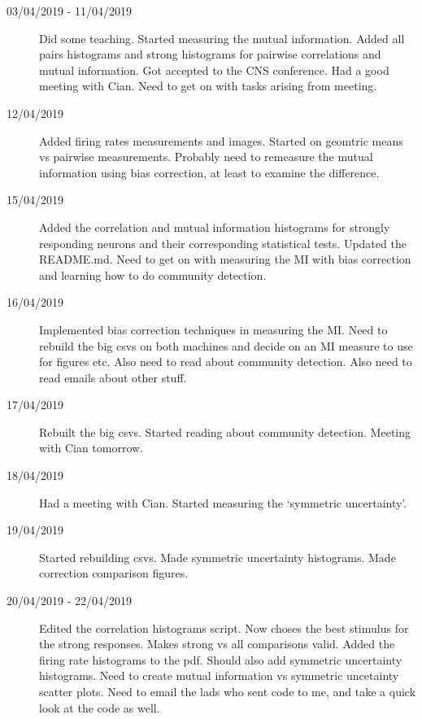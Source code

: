 \documentclass[a4paper,12pt]{article}
\theoremstyle{definition}
\begin{document}
\begin{description}
				\item[03/04/2019 - 11/04/2019] Did some teaching. Started measuring the mutual information. Added all pairs histograms and strong histograms for pairwise correlations and mutual information. Got accepted to the CNS conference. Had a good meeting with Cian. Need to get on with tasks arising from meeting.

				\item[12/04/2019] Added firing rates measurements and images. Started on geomtric means vs pairwise measurements. Probably need to remeasure the mutual information using bias correction, at least to examine the difference.

                                \item[15/04/2019] Added the correlation and mutual information histograms for strongly responding neurons and their corresponding statistical tests. Updated the README.md. Need to get on with measuring the MI with bias correction and learning how to do community detection.

                                \item[16/04/2019] Implemented bias correction techniques in measuring the MI. Need to rebuild the big csvs on both machines and decide on an MI measure to use for figures etc. Also need to read about community detection. Also need to read emails about other stuff.

                                \item[17/04/2019] Rebuilt the big csvs. Started reading about community detection. Meeting with Cian tomorrow.

                                \item[18/04/2019] Had a meeting with Cian. Started measuring the `symmetric uncertainty'.

                                \item[19/04/2019] Started rebuilding csvs. Made symmetric uncertainty histograms. Made correction comparison figures.

                                \item[20/04/2019 - 22/04/2019] Edited the correlation histograms script. Now choses the best stimulus for the strong responses. Makes strong vs all comparisons valid. Added the firing rate histograms to the pdf. Should also add symmetric uncertainty histograms. Need to create mutual information vs symmetric uncetainty scatter plots. Need to email the lads who sent code to me, and take a quick look at the code as well.


\end{description}
\end{document}
